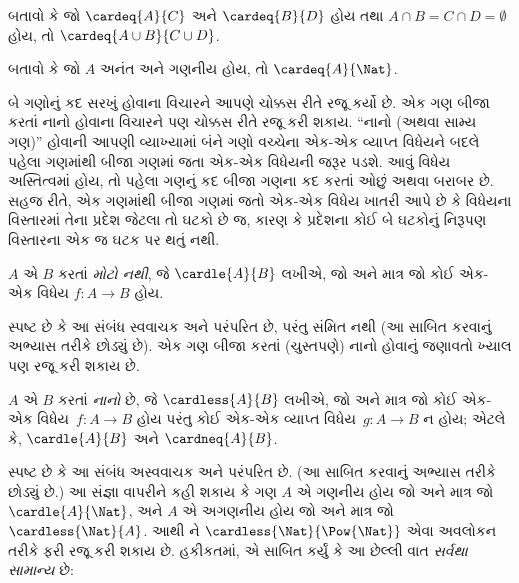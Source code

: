 \begin{prob}
બતાવો કે જો $\cardeq{A}{C}$ અને $\cardeq{B}{D}$ હોય તથા
$A \cap B = C \cap D = \emptyset$ હોય, તો
$\cardeq{A \cup B}{C \cup D}$.
\end{prob}

\begin{prob}
બતાવો કે જો $A$ અનંત અને ગણનીય હોય, તો
$\cardeq{A}{\Nat}$.
\end{prob}
\endgroup


\begingroup
\makeatletter{}\makeatother


\label{guunit:OLP-0036}


\begin{explain}
બે ગણોનું કદ સરખું હોવાના વિચારને આપણે ચોક્કસ રીતે રજૂ કર્યો છે.
એક ગણ બીજા કરતાં નાનો હોવાના વિચારને પણ ચોક્કસ રીતે રજૂ કરી શકાય.
“નાનો (અથવા સામ્ય ગણ)” હોવાની આપણી વ્યાખ્યામાં બંને ગણો વચ્ચેના
એક-એક વ્યાપ્ત વિધેયને બદલે પહેલા ગણમાંથી બીજા ગણમાં જતા એક-એક વિધેયની
જરૂર પડશે. આવું વિધેય અસ્તિત્વમાં હોય, તો પહેલા ગણનું કદ બીજા
ગણના કદ કરતાં ઓછું અથવા બરાબર છે. સહજ રીતે, એક ગણમાંથી બીજા ગણમાં
જતો એક-એક વિધેય ખાતરી આપે છે કે વિધેયના વિસ્તારમાં તેના પ્રદેશ
જેટલા તો ઘટકો છે જ, કારણ કે પ્રદેશના કોઈ બે ઘટકોનું
નિરૂપણ વિસ્તારના એક જ ઘટક પર થતું નથી.
\end{explain}

\begin{defn}
$A$ એ $B$ કરતાં \emph{મોટો નથી}, જે $\cardle{A}{B}$ લખીએ,
જો અને માત્ર જો કોઈ એક-એક વિધેય $f \colon A \to B$ હોય.
\end{defn}

સ્પષ્ટ છે કે આ સંબંધ સ્વવાચક અને પરંપરિત છે, પરંતુ સંમિત નથી
(આ સાબિત કરવાનું અભ્યાસ તરીકે છોડ્યું છે). એક ગણ બીજા કરતાં
(ચુસ્તપણે) નાનો હોવાનું જણાવતો ખ્યાલ પણ રજૂ કરી શકાય છે.

\begin{defn}
$A$ એ $B$ કરતાં \emph{નાનો} છે, જે $\cardless{A}{B}$ લખીએ,
જો અને માત્ર જો કોઈ એક-એક વિધેય~$f\colon A \to B$ હોય પરંતુ
કોઈ એક-એક વ્યાપ્ત વિધેય~$g\colon A \to B$ ન હોય; એટલે કે,
$\cardle{A}{B}$ અને $\cardneq{A}{B}$.
\end{defn}

સ્પષ્ટ છે કે આ સંબંધ અસ્વવાચક અને પરંપરિત છે. (આ સાબિત કરવાનું
અભ્યાસ તરીકે છોડ્યું છે.) આ સંજ્ઞા વાપરીને કહી શકાય કે ગણ $A$ એ
ગણનીય હોય જો અને માત્ર જો $\cardle{A}{\Nat}$, અને $A$ એ
અગણનીય હોય જો અને માત્ર જો $\cardless{\Nat}{A}$.
આથી
%
ને
$\cardless{\Nat}{\Pow{\Nat}}$ એવા અવલોકન તરીકે ફરી રજૂ
કરી શકાય છે. હકીકતમાં, \citet{Cantor1892}એ સાબિત કર્યું કે આ છેલ્લી
વાત \emph{સર્વથા સામાન્ય} છે:

